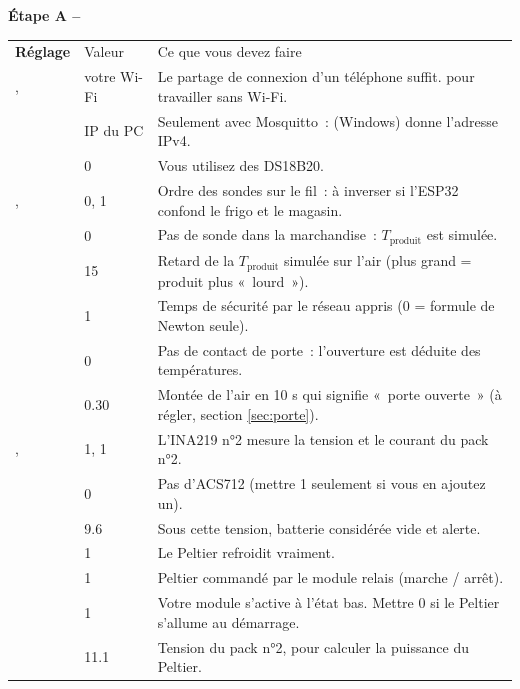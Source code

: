 \textbf{Étape A -- }

\begin{tabularx}{\linewidth}{P{4.4cm}P{2.6cm}L}
 \textbf{Réglage} & Valeur & Ce que vous devez faire \\
,  & votre Wi-Fi & Le partage de connexion d'un téléphone suffit.  pour travailler sans Wi-Fi. \\
 & IP du PC & Seulement avec Mosquitto~:  (Windows) donne l'adresse IPv4. \\
 & 0 & Vous utilisez des DS18B20. \\
,  & 0, 1 & Ordre des sondes sur le fil~: à inverser si l'ESP32 confond le frigo et le magasin. \\
 & 0 & Pas de sonde dans la marchandise~: $T_{\text{produit}}$ est simulée. \\
 & 15 & Retard de la $T_{\text{produit}}$ simulée sur l'air (plus grand = produit plus «~lourd~»). \\
 & 1 & Temps de sécurité par le réseau appris (0 = formule de Newton seule). \\
 & 0 & Pas de contact de porte~: l'ouverture est déduite des températures. \\
 & 0.30 & Montée de l'air en 10 s qui signifie «~porte ouverte~» (à régler, section \ref{sec:porte}). \\
,  & 1, 1 & L'INA219 n°2 mesure la tension et le courant du pack n°2. \\
 & 0 & Pas d'ACS712 (mettre 1 seulement si vous en ajoutez un). \\
 & 9.6 & Sous cette tension, batterie considérée vide et alerte. \\
 & 1 & Le Peltier refroidit vraiment. \\
 & 1 & Peltier commandé par le module relais (marche / arrêt). \\
 & 1 & Votre module s'active à l'état bas. Mettre 0 si le Peltier s'allume au démarrage. \\
 & 11.1 & Tension du pack n°2, pour calculer la puissance du Peltier. \\

\end{tabularx}
